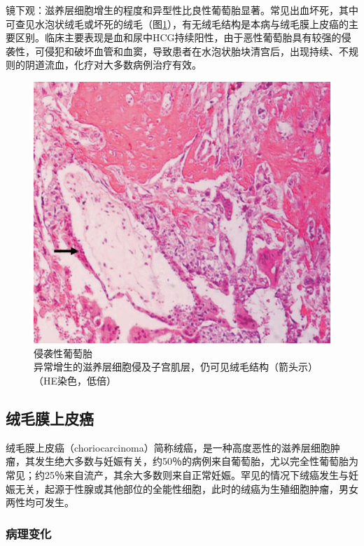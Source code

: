 镜下观：滋养层细胞增生的程度和异型性比良性葡萄胎显著。常见出血坏死，其中可查见水泡状绒毛或坏死的绒毛（图\ref{fig11-7}），有无绒毛结构是本病与绒毛膜上皮癌的主要区别。临床主要表现是血和尿中HCG持续阳性，由于恶性葡萄胎具有较强的侵袭性，可侵犯和破坏血管和血窦，导致患者在水泡状胎块清宫后，出现持续、不规则的阴道流血，化疗对大多数病例治疗有效。

\begin{figure}[!htbp]
 \centering
 \includegraphics{./images/Image00192.jpg}
 \captionsetup{justification=centering}
 \caption{侵袭性葡萄胎\\ {\small 异常增生的滋养层细胞侵及子宫肌层，仍可见绒毛结构（箭头示）（HE染色，低倍）}}
\label{fig11-7}
  \end{figure}

\subsection{绒毛膜上皮癌}

绒毛膜上皮癌（choriocarcinoma）简称绒癌，是一种高度恶性的滋养层细胞肿瘤，其发生绝大多数与妊娠有关，约50％的病例来自葡萄胎，尤以完全性葡萄胎为常见；约25％来自流产，其余大多数则来自正常妊娠。罕见的情况下绒癌发生与妊娠无关，起源于性腺或其他部位的全能性细胞，此时的绒癌为生殖细胞肿瘤，男女两性均可发生。

\subsubsection{病理变化}

